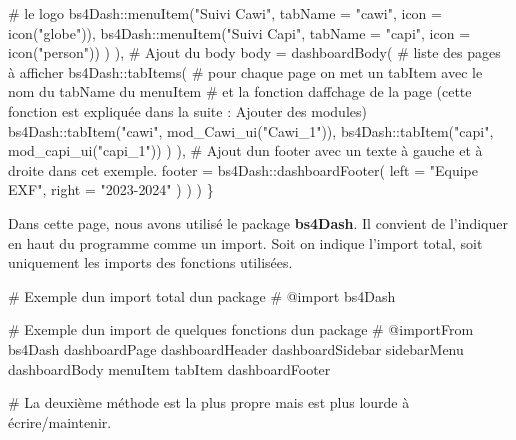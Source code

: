 \documentclass[
  letterpaper,
  DIV=11,
  numbers=noendperiod]{scrreprt}
\newenvironment{Shaded}{\begin{snugshade}}{\end{snugshade}}
\newcommand{\AttributeTok}[1]{\textcolor[rgb]{0.40,0.45,0.13}{#1}}
\newcommand{\CommentTok}[1]{\textcolor[rgb]{0.37,0.37,0.37}{#1}}
\newcommand{\FunctionTok}[1]{\textcolor[rgb]{0.28,0.35,0.67}{#1}}
\newcommand{\NormalTok}[1]{\textcolor[rgb]{0.00,0.23,0.31}{#1}}
\newcommand{\SpecialCharTok}[1]{\textcolor[rgb]{0.37,0.37,0.37}{#1}}
\newcommand{\StringTok}[1]{\textcolor[rgb]{0.13,0.47,0.30}{#1}}
\begin{document}
\begin{Shaded}
\begin{Highlighting}[]
          \CommentTok{\# le logo}
\NormalTok{          bs4Dash}\SpecialCharTok{::}\FunctionTok{menuItem}\NormalTok{(}\StringTok{"Suivi Cawi"}\NormalTok{, }\AttributeTok{tabName =} \StringTok{"cawi"}\NormalTok{, }\AttributeTok{icon =} \FunctionTok{icon}\NormalTok{(}\StringTok{"globe"}\NormalTok{)),}
\NormalTok{          bs4Dash}\SpecialCharTok{::}\FunctionTok{menuItem}\NormalTok{(}\StringTok{"Suivi Capi"}\NormalTok{, }\AttributeTok{tabName =} \StringTok{"capi"}\NormalTok{, }\AttributeTok{icon =} \FunctionTok{icon}\NormalTok{(}\StringTok{"person"}\NormalTok{))}
\NormalTok{        )}
\NormalTok{      ),}
      \CommentTok{\# Ajout du body}
      \AttributeTok{body =} \FunctionTok{dashboardBody}\NormalTok{(}
        \CommentTok{\# liste des pages à afficher}
\NormalTok{        bs4Dash}\SpecialCharTok{::}\FunctionTok{tabItems}\NormalTok{(}
          \CommentTok{\# pour chaque page on met un tabItem avec le nom du tabName du menuItem}
          \CommentTok{\# et la fonction d\textquotesingle{}affchage de la page (cette fonction est expliquée dans la suite : Ajouter des modules)}
\NormalTok{          bs4Dash}\SpecialCharTok{::}\FunctionTok{tabItem}\NormalTok{(}\StringTok{"cawi"}\NormalTok{, }\FunctionTok{mod\_Cawi\_ui}\NormalTok{(}\StringTok{"Cawi\_1"}\NormalTok{)),}
\NormalTok{          bs4Dash}\SpecialCharTok{::}\FunctionTok{tabItem}\NormalTok{(}\StringTok{"capi"}\NormalTok{, }\FunctionTok{mod\_capi\_ui}\NormalTok{(}\StringTok{"capi\_1"}\NormalTok{))}
\NormalTok{        )}
\NormalTok{      ),}
      \CommentTok{\# Ajout d\textquotesingle{}un footer avec un texte à gauche et à droite dans cet exemple.}
      \AttributeTok{footer =}\NormalTok{ bs4Dash}\SpecialCharTok{::}\FunctionTok{dashboardFooter}\NormalTok{(}
        \AttributeTok{left =} \StringTok{"Equipe EXF"}\NormalTok{,}
        \AttributeTok{right =} \StringTok{"2023{-}2024"}
\NormalTok{      )}
\NormalTok{    )}
\NormalTok{  )}
\NormalTok{\}}
\end{Highlighting}
\end{Shaded}

Dans cette page, nous avons utilisé le package \textbf{bs4Dash}. Il
convient de l'indiquer en haut du programme comme un import. Soit on
indique l'import total, soit uniquement les imports des fonctions
utilisées.

\begin{Shaded}
\begin{Highlighting}[]
\CommentTok{\# Exemple d\textquotesingle{}un import total d\textquotesingle{}un package}
\CommentTok{\#\textquotesingle{} @import bs4Dash}

\CommentTok{\# Exemple d\textquotesingle{}un import de quelques fonctions d\textquotesingle{}un package}
\CommentTok{\#\textquotesingle{} @importFrom bs4Dash dashboardPage dashboardHeader dashboardSidebar sidebarMenu dashboardBody menuItem tabItem dashboardFooter}

\CommentTok{\# La deuxième méthode est la plus propre mais est plus lourde à écrire/maintenir.}
\end{Highlighting}
\end{Shaded}
\end{document}
